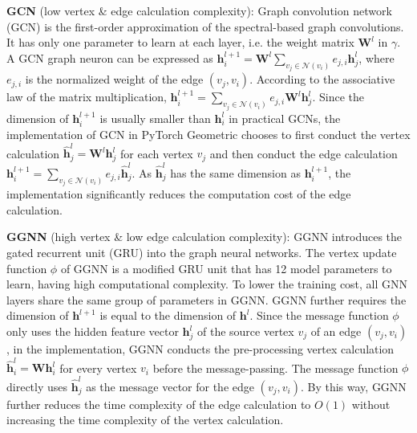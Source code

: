 \textbf{GCN} \cite{kipf2017_gcn} (low vertex \& edge calculation complexity): Graph convolution network (GCN) is the first-order approximation of the spectral-based graph convolutions.
It has only one parameter to learn at each layer, i.e. the weight matrix $\boldsymbol{W}^l$ in $\gamma$.
A GCN graph neuron can be expressed as $\boldsymbol{h}^{l+1}_i = \boldsymbol{W}^l\sum_{v_j \in \mathcal{N}(v_i)}{e_{j,i}\boldsymbol{h}^l_j}$, where $e_{j,i}$ is the normalized weight of the edge $(v_j, v_i)$.
According to the associative law of the matrix multiplication, $\boldsymbol{h}^{l+1}_i = \sum_{v_j \in \mathcal{N}(v_i)}{e_{j,i}\boldsymbol{W}^l\boldsymbol{h}^l_j}$.
Since the dimension of $\boldsymbol{h}^{l+1}_i$ is usually smaller than $\boldsymbol{h}^l_i$ in practical GCNs, the implementation of GCN in PyTorch Geometric chooses to first conduct the vertex calculation $\hat{\boldsymbol{h}}^l_j = \boldsymbol{W}^l\boldsymbol{h}^l_j$ for each vertex $v_j$ and then conduct the edge calculation $\boldsymbol{h}^{l+1}_i=\sum_{v_j\in\mathcal{N}(v_i)}{e_{j,i}\hat{\boldsymbol{h}}^l_j}$.
As $\hat{\boldsymbol{h}}^l_j$ has the same dimension as $\boldsymbol{h}^{l+1}_i$, the implementation significantly reduces the  computation cost of the edge calculation.

\textbf{GGNN} (high vertex \& low edge calculation complexity):
GGNN introduces the gated recurrent unit (GRU) into the graph neural networks.
The vertex update function $\phi$ of GGNN is a modified GRU unit that has 12 model parameters to learn, having high computational complexity.
To lower the training cost, all GNN layers share the same group of parameters in GGNN.
GGNN further requires the dimension of $\boldsymbol{h}^{l+1}$ is equal to the dimension of $\boldsymbol{h}^l$.
Since the message function $\phi$ only uses the hidden feature vector $\boldsymbol{h}^l_j$ of the source vertex $v_j$ of an edge $(v_j, v_i)$, in the implementation, GGNN conducts the pre-processing vertex calculation $\hat{\boldsymbol{h}}^l_i=\boldsymbol{W}\boldsymbol{h}^l_i$ for every vertex $v_i$ before the message-passing.
The message function $\phi$ directly uses $\hat{\boldsymbol{h}}^l_j$ as the message vector for the edge $(v_j, v_i)$. 
By this way, GGNN further reduces the time complexity of the edge calculation to $O(1)$ without increasing the time complexity of the vertex calculation. 

